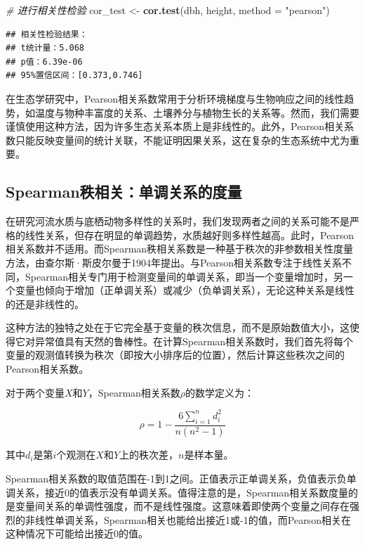 \documentclass[
  twoside,12pt,fontset=none]{ctexbook}
\newenvironment{Shaded}{\begin{snugshade}}{\end{snugshade}}
\newcommand{\AttributeTok}[1]{\textcolor[rgb]{0.13,0.29,0.53}{#1}}
\newcommand{\CommentTok}[1]{\textcolor[rgb]{0.56,0.35,0.01}{\textit{#1}}}
\newcommand{\FunctionTok}[1]{\textcolor[rgb]{0.13,0.29,0.53}{\textbf{#1}}}
\newcommand{\NormalTok}[1]{#1}
\newcommand{\OtherTok}[1]{\textcolor[rgb]{0.56,0.35,0.01}{#1}}
\newcommand{\StringTok}[1]{\textcolor[rgb]{0.31,0.60,0.02}{#1}}
\begin{document}
\begin{Shaded}
\begin{Highlighting}[]
\CommentTok{\# 进行相关性检验}
\NormalTok{cor\_test }\OtherTok{\textless{}{-}} \FunctionTok{cor.test}\NormalTok{(dbh, height, }\AttributeTok{method =} \StringTok{"pearson"}\NormalTok{)}
\end{Highlighting}
\end{Shaded}

\begin{verbatim}
## 相关性检验结果：
## t统计量：5.068
## p值：6.39e-06
## 95%置信区间：[0.373,0.746]
\end{verbatim}

在生态学研究中，Pearson相关系数常用于分析环境梯度与生物响应之间的线性趋势，如温度与物种丰富度的关系、土壤养分与植物生长的关系等。然而，我们需要谨慎使用这种方法，因为许多生态关系本质上是非线性的。此外，Pearson相关系数只能反映变量间的统计关联，不能证明因果关系，这在复杂的生态系统中尤为重要。

\hypertarget{spearmanux79e9ux76f8ux5173ux5355ux8c03ux5173ux7cfbux7684ux5ea6ux91cf}{%
\subsection{Spearman秩相关：单调关系的度量}\label{spearmanux79e9ux76f8ux5173ux5355ux8c03ux5173ux7cfbux7684ux5ea6ux91cf}}

在研究河流水质与底栖动物多样性的关系时，我们发现两者之间的关系可能不是严格的线性关系，但存在明显的单调趋势，水质越好则多样性越高。此时，Pearson相关系数并不适用。而Spearman秩相关系数是一种基于秩次的非参数相关性度量方法，由查尔斯·斯皮尔曼于1904年提出。与Pearson相关系数专注于线性关系不同，Spearman相关专门用于检测变量间的单调关系，即当一个变量增加时，另一个变量也倾向于增加（正单调关系）或减少（负单调关系），无论这种关系是线性的还是非线性的。

这种方法的独特之处在于它完全基于变量的秩次信息，而不是原始数值大小，这使得它对异常值具有天然的鲁棒性。在计算Spearman相关系数时，我们首先将每个变量的观测值转换为秩次（即按大小排序后的位置），然后计算这些秩次之间的Pearson相关系数。

对于两个变量\(X\)和\(Y\)，Spearman相关系数\(\rho\)的数学定义为：

\[\rho = 1 - \frac{6\sum_{i=1}^{n}d_i^2}{n(n^2-1)}\]

其中\(d_i\)是第\(i\)个观测在\(X\)和\(Y\)上的秩次差，\(n\)是样本量。

Spearman相关系数的取值范围在-1到1之间。正值表示正单调关系，负值表示负单调关系，接近0的值表示没有单调关系。值得注意的是，Spearman相关系数度量的是变量间关系的单调性强度，而不是线性强度。这意味着即使两个变量之间存在强烈的非线性单调关系，Spearman相关也能给出接近1或-1的值，而Pearson相关在这种情况下可能给出接近0的值。
\end{document}
